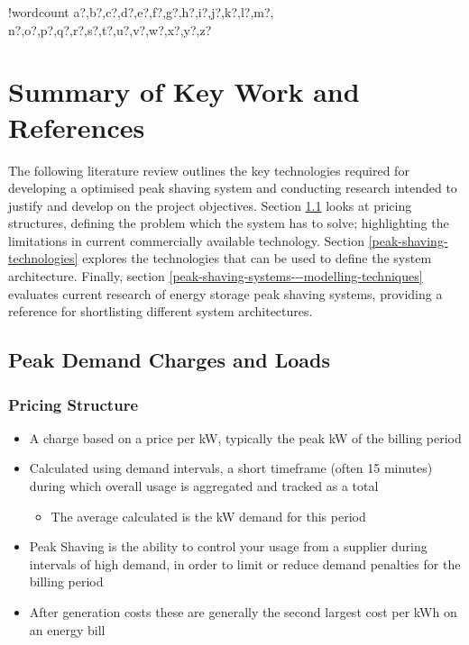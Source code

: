 \documentclass[10pt]{article}
\providecommand{\tightlist}{%
  \setlength{\itemsep}{0pt}\setlength{\parskip}{0pt}}
\newcounter{words}
\newenvironment{counted}{%
  \setcounter{words}{0}
  \SearchList!{wordcount}{\stepcounter{words}}
    {a?,b?,c?,d?,e?,f?,g?,h?,i?,j?,k?,l?,m?,
    n?,o?,p?,q?,r?,s?,t?,u?,v?,w?,x?,y?,z?}
  \UndoBoundary{'}
  \SearchOrder{p;}}{%
  \StopSearching}
\begin{document}
\begin{counted}
\newpage

\section{Summary of Key Work and
References}\label{summary-of-key-work-and-references}

The following literature review outlines the key technologies required
for developing a optimised peak shaving system and conducting research
intended to justify and develop on the project objectives. Section
\ref{peak-demand-charges-and-loads} looks at pricing structures,
defining the problem which the system has to solve; highlighting the
limitations in current commercially available technology. Section
\ref{peak-shaving-technologies} explores the technologies that can be
used to define the system architecture. Finally, section
\ref{peak-shaving-systems---modelling-techniques} evaluates current
research of energy storage peak shaving systems, providing a reference
for shortlisting different system architectures.

\subsection{Peak Demand Charges and
Loads}\label{peak-demand-charges-and-loads}

\subsubsection{Pricing Structure}\label{pricing-structure}

\begin{itemize}
\tightlist
\item
  A charge based on a price per kW, typically the peak kW of the billing
  period\cite{schneiderRECPS}
\item
  Calculated using demand intervals, a short timeframe (often 15
  minutes) during which overall usage is aggregated and tracked as a
  total

  \begin{itemize}
  \tightlist
  \item
    The average calculated is the kW demand for this period
  \end{itemize}
\item
  Peak Shaving is the ability to control your usage from a supplier
  during intervals of high demand, in order to limit or reduce demand
  penalties for the billing period
\item
  After generation costs these are generally the second largest cost per
  kWh on an energy bill
\end{itemize}


\end{counted}
\end{document}
